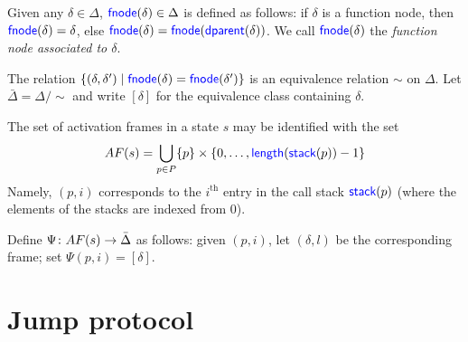 \begin{definition}
  Given any $\delta\in\Delta$, $\textup{\textsf{\textcolor{blue}{fnode}}}(\delta)\in\Delta$ is defined as
  follows: if $\delta$ is a function node, then
  $\textup{\textsf{\textcolor{blue}{fnode}}}(\delta)=\delta$, else
  $\textup{\textsf{\textcolor{blue}{fnode}}}(\delta)=\textup{\textsf{\textcolor{blue}{fnode}}}(\textup{\textsf{\textcolor{blue}{dparent}}}(\delta))$.  We call $\textup{\textsf{\textcolor{blue}{fnode}}}(\delta)$
  the \emph{function node associated to $\delta$}.
\end{definition}

The relation $\{(\delta,\delta')\mid \textup{\textsf{\textcolor{blue}{fnode}}}(\delta)=\textup{\textsf{\textcolor{blue}{fnode}}}(\delta')\}$
is an equivalence relation $\sim$ on $\Delta$.  Let
$\bar{\Delta}=\Delta/\sim$ and write $[\delta]$ for the equivalence
class containing $\delta$.

The set of activation frames in a state $s$ may be identified with the 
set
\[
AF(s)=\bigcup_{p\in P}\{p\}\times\{0,\ldots,\textup{\textsf{\textcolor{blue}{length}}}(\textup{\textsf{\textcolor{blue}{stack}}}(p))-1\}
\]
Namely, $(p,i)$ corresponds to the $i^{\text{th}}$ entry in the call
stack $\textup{\textsf{\textcolor{blue}{stack}}}(p)$ (where the elements of the stacks are indexed from
$0$).

Define $\Psi\colon AF(s)\rightarrow \bar{\Delta}$ as follows: given $(p,i)$,
let $(\delta,l)$ be the corresponding frame; set $\Psi(p,i)=[\delta]$.



\section{Jump protocol}
\label{sec:jump}




